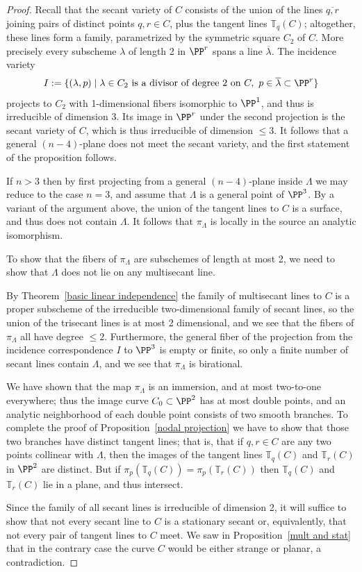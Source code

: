 \begin{proof} Recall that the secant variety of $C$ consists of the union of the lines $\overline{q,r}$ joining pairs of distinct points $q,r \in C$, plus the tangent lines ${\mathbb T}_q(C)$; altogether, these lines form a family, parametrized by the symmetric square $C_2$ of $C$. More precisely every subscheme $\lambda$ of
length 2 in $\PP^r$ spans a line $\overline \lambda$. The incidence variety
$$
I:=\{(\lambda, p)\mid \lambda\in C_2 \hbox{ is a divisor of degree 2 on }C,\ p\in \overline \lambda\subset\PP^r\}
$$
projects to $C_2$ with 1-dimensional fibers isomorphic to $\PP^1$, and thus
is irreducible of dimension 3. Its image in $\PP^r$ under the second projection
is the secant variety of $C$, which is thus irreducible of dimension $\leq 3$.
It follows that a general
$(n-4)$-plane does not meet the secant variety, and the first statement of the proposition follows.

If $n>3$ then by first projecting from a general $(n-4)$-plane inside $\Lambda$ we may reduce to the case $n=3$, and assume that $\Lambda$ is a general point of $\PP^3$. By a variant of the argument above, the union 
of the tangent lines to $C$ is a surface, and thus does not contain $\Lambda$.
It follows that $\pi_\Lambda$ is locally in the source an analytic isomorphism.

To show that the fibers of $\pi_\Lambda$ are subschemes of length at most 2,
we need to show that $\Lambda$ does not lie on any multisecant line. 

By Theorem~\ref{basic linear independence} the family of multisecant lines to $C$ is a proper subscheme of the irreducible two-dimensional family of secant lines, so the union of the trisecant lines is at most 2 dimensional, and we see that the fibers of $\pi_\Lambda$ all have degree $\leq 2$. Furthermore, the general fiber of the projection
from the incidence correspondence $I$ to $\PP^3$ is empty or finite, so only a finite number of secant lines contain $\Lambda$, and we see that $\pi_\Lambda$ is birational. 

We have shown that the map $\pi_\Lambda$ is an immersion, and at most two-to-one everywhere; thus the image curve $C_0 \subset \PP^2$ has at most double points, and an analytic neighborhood of each double point  consists of two smooth branches. To complete the proof of Proposition~\ref{nodal projection} we have to show that those two branches have distinct tangent lines; that is, that
if $q, r \in C$ are any two points collinear with $\Lambda$, then the images of the tangent lines ${\mathbb T}_q(C)$ and ${\mathbb T}_r(C)$ in $\PP^2$ are distinct. But if  $\pi_p({\mathbb T}_q(C)) = \pi_p({\mathbb T}_r(C))$ then  ${\mathbb T}_q(C)$ and ${\mathbb T}_r(C)$ lie in a plane, and thus intersect.

Since the family of all secant lines is irreducible of dimension 2,  it will suffice to show that not every secant line to $C$ is a stationary secant or, equivalently, that not every pair of tangent lines to $C$ meet. We saw in Proposition~\ref{mult and stat} that in the contrary case the curve $C$ would be either strange or planar, a contradiction.
\end{proof}



